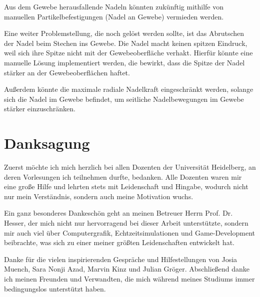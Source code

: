 Aus dem Gewebe herausfallende Nadeln könnten zukünftig mithilfe von manuellen Partikelbefestigungen (Nadel an Gewebe) vermieden werden.

Eine weiter Problemstellung, die noch gelöst werden sollte, ist das Abrutschen der Nadel beim Stechen ins Gewebe. Die Nadel macht keinen spitzen Eindruck, weil sich ihre Spitze nicht mit der Gewebeoberfläche verhakt. Hierfür könnte eine manuelle Lösung implementiert werden, die bewirkt, dass die Spitze der Nadel stärker an der Gewebeoberflächen haftet.

Außerdem könnte die maximale radiale Nadelkraft eingeschränkt werden, solange sich die Nadel im Gewebe befindet, um seitliche Nadelbewegungen im Gewebe stärker einzuschränken.











\chapter*{Danksagung}
Zuerst möchte ich mich herzlich bei allen Dozenten der Universität Heidelberg, an deren Vorlesungen ich teilnehmen durfte, bedanken. Alle Dozenten waren mir eine große Hilfe und lehrten stets mit Leidenschaft und Hingabe, wodurch nicht nur mein Verständnis, sondern auch meine Motivation wuchs.

Ein ganz besonderes Dankeschön geht an meinen Betreuer Herrn Prof. Dr. Hesser, der mich nicht nur hervorragend bei dieser Arbeit unterstützte, sondern mir auch viel über Computergrafik, Echtzeitsimulationen und Game-Development beibrachte, was sich zu einer meiner größten Leidenschaften entwickelt hat.

Danke für die vielen inspirierenden Gespräche und Hilfestellungen von Josia Muench, Sara Nonji Azad, Marvin Kinz und Julian Gröger. Abschließend danke ich meinen Freunden und Verwandten, die mich während meines Studiums immer bedingungslos unterstützt haben.
